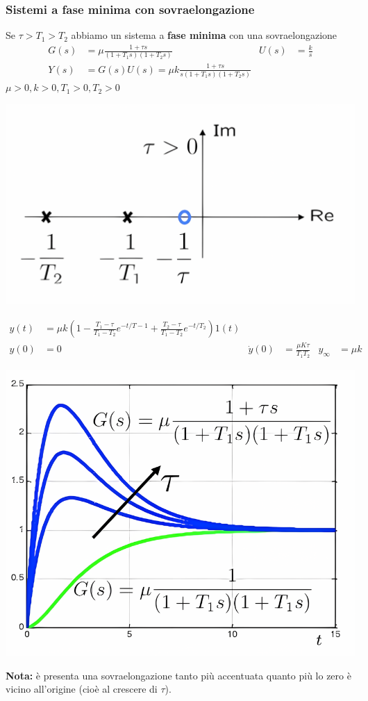 \documentclass{article}
\numberwithin{equation}{subsection}
\begin{document}
\subsubsection{Sistemi a fase minima con sovraelongazione}
Se $\tau>T_1>T_2$ abbiamo un sistema a \textbf{fase minima} con una sovraelongazione
\begin{align*}
    G(s) &= \mu\frac{1 + \tau s}{(1+T_1s)(1+T_2s)} & U(s) &= \frac{k}{s}\\
    Y(s) &= G(s)U(s) = \mu k \frac{1+ \tau s}{s(1+T_1s)(1+T_2s)}
\end{align*}
$\mu>0,k>0,T_1>0,T_2>0$

\begin{center}
    \includegraphics[scale=0.23]{Images/Fase_minima_1.png}
\end{center}

\begin{align*}
    y(t) &= \mu k \left( 1 - \frac{T_1-\tau}{T_1-T_2} e^{-t/T-1} + \frac{T_2-\tau}{T_1-T_2}e^{-t/T_2} \right)1(t)\\
    y(0) &= 0 & \dot y(0) &= \frac{\mu K \tau}{T_1T_2} & y_{\infty} &= \mu k
\end{align*}
\begin{center}
    \includegraphics[scale=0.23]{Images/Fase_minima_2.png}
\end{center}
\textbf{Nota:} è presenta una sovraelongazione tanto più accentuata quanto più lo zero è vicino all'origine (cioè al crescere di $\tau$).
\end{document}
